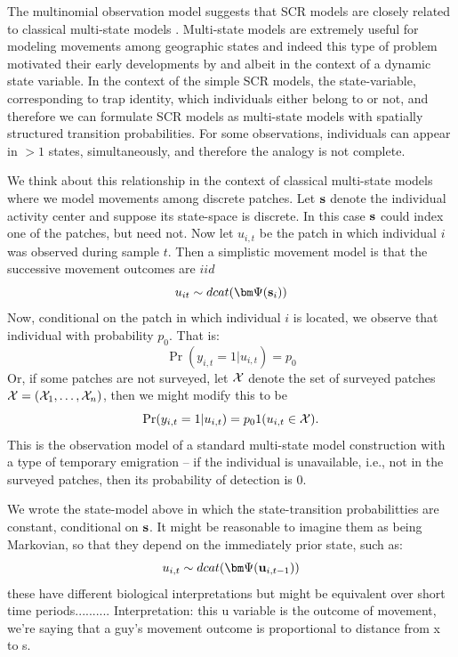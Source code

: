 The multinomial observation model
suggests that SCR models are closely related to
classical multi-state models \citep[][Chapt. 9]{kery_schaub:2011}.
Multi-state models are extremely useful for modeling movements among
geographic states and indeed this type of problem motivated their
early developments by \citet{arnason:1972,arnason:1973} and
\citet{hestbeck_etal:1991} albeit in the context of a dynamic state
variable.  In the context of the simple SCR models, the
state-variable, corresponding to trap identity, which individuals
either belong to or not, and therefore we can formulate SCR models as
multi-state models with spatially structured transition probabilities.
For some observations, individuals can appear in $>1$ states,
simultaneously, and therefore the analogy is not complete.


We think about this relationship in the context of classical
multi-state models where we model movements among discrete patches.
Let ${\bf s}$ denote the individual activity
center and suppose its state-space is discrete. In this case ${\bf s}$
could index one of the patches, but need not.
Now let $u_{i,t}$ be
the patch in which individual $i$ was observed during sample $t$. Then
a simplistic movement model is that the successive movement outcomes
are $iid$
\[
u_{it} \sim  dcat( {\bm \Psi}({\bf s}_{i}) )
\]
Now, conditional on the patch in which individual $i$ is located, we
observe that individual with probability $p_{0}$. That is:
\[
 \Pr(y_{i,t} = 1| u_{i,t} )  = p_{0}
\]
Or, if some patches are not surveyed, let ${\cal X}$ denote the set of
surveyed patches ${\cal X} = ({\cal X}_{1},\ldots,{\cal X}_{n})$,
then we might modify this to be
\[
 \Pr(y_{i,t} = 1| u_{i,t} )  = p_{0}1(u_{i,t} \in {\cal X}).
\]
This is the observation model of a standard multi-state model construction with a type of
temporary emigration -- if the individual is unavailable, i.e., not in
the surveyed patches, then its probability of detection is 0.

We wrote the state-model above in which the state-transition
probabilitties are constant, conditional on ${\bf s}$.
It might be reasonable to imagine them as being Markovian, so that
they depend on the immediately prior state, such as:
\[
u_{i,t} \sim  dcat( {\bm \Psi}({\bf u}_{i,t-1}) )
\]
these have different biological interpretations but might be
equivalent over short time periods..........
Interpretation: this u variable is the outcome of movement,
we're saying that a guy's movement outcome is proportional to distance
from x to s.

